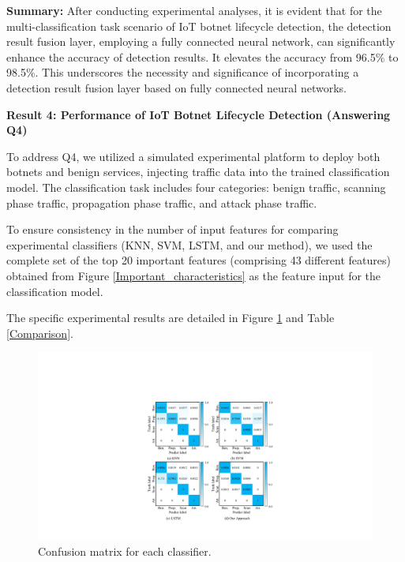 \documentclass[journal]{IEEEtai}
\begin{document}
\textbf{Summary:}
After conducting experimental analyses, it is evident that for the multi-classification task scenario of IoT botnet lifecycle detection, the detection result fusion layer, employing a fully connected neural network, can significantly enhance the accuracy of detection results.
It elevates the accuracy from 96.5\% to 98.5\%.
This underscores the necessity and significance of incorporating a detection result fusion layer based on fully connected neural networks.

\textbf{Result 4: Performance of IoT Botnet Lifecycle Detection (Answering Q4)}

To address Q4, we utilized a simulated experimental platform to deploy both botnets and benign services, injecting traffic data into the trained classification model. 
The classification task includes four categories: benign traffic, scanning phase traffic, propagation phase traffic, and attack phase traffic.

To ensure consistency in the number of input features for comparing experimental classifiers (KNN, SVM, LSTM, and our method), we used the complete set of the top 20 important features (comprising 43 different features) obtained from Figure \ref{Important_characteristics} as the feature input for the classification model.

The specific experimental results are detailed in Figure \ref{Confusion_matrix} and Table \ref{Comparison}.

\begin{figure}[!h]
	\centering
	\includegraphics[width = \linewidth]{Figures/confusion matrix.pdf}
	\caption{Confusion matrix for each classifier.}
	\label{Confusion_matrix}
\end{figure}
\end{document}
